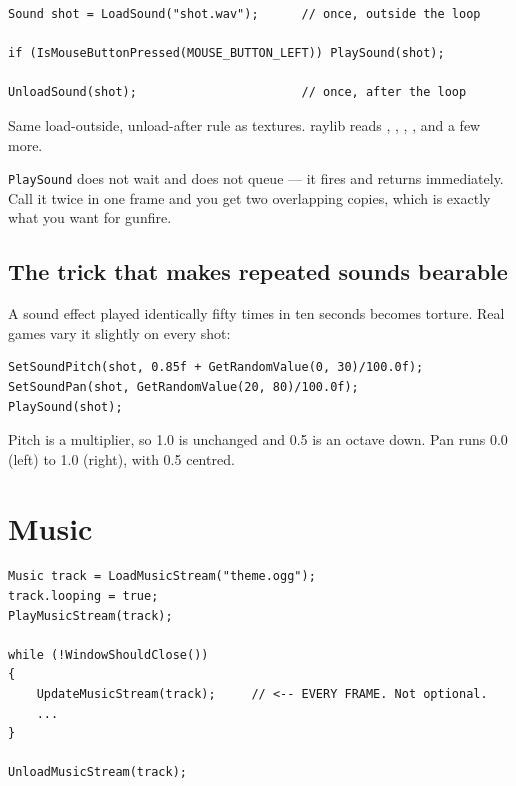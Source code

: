 \begin{lstlisting}
Sound shot = LoadSound("shot.wav");      // once, outside the loop

if (IsMouseButtonPressed(MOUSE_BUTTON_LEFT)) PlaySound(shot);

UnloadSound(shot);                       // once, after the loop
\end{lstlisting}

Same load-outside, unload-after rule as textures. raylib reads ,
, , ,  and a few more.

\lstinline|PlaySound| does not wait and does not queue --- it fires and returns
immediately. Call it twice in one frame and you get two overlapping copies, which
is exactly what you want for gunfire.

\subsection{The trick that makes repeated sounds bearable}

A sound effect played identically fifty times in ten seconds becomes torture.
Real games vary it slightly on every shot:

\begin{lstlisting}
SetSoundPitch(shot, 0.85f + GetRandomValue(0, 30)/100.0f);
SetSoundPan(shot, GetRandomValue(20, 80)/100.0f);
PlaySound(shot);
\end{lstlisting}

Pitch is a multiplier, so 1.0 is unchanged and 0.5 is an octave down. Pan runs
0.0 (left) to 1.0 (right), with 0.5 centred.


\section{Music}

\begin{lstlisting}
Music track = LoadMusicStream("theme.ogg");
track.looping = true;
PlayMusicStream(track);

while (!WindowShouldClose())
{
    UpdateMusicStream(track);     // <-- EVERY FRAME. Not optional.
    ...
}

UnloadMusicStream(track);
\end{lstlisting}


